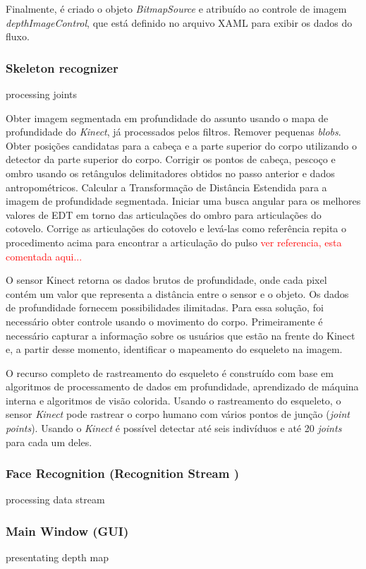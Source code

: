 Finalmente, é criado o objeto \textit{BitmapSource} e atribuído ao controle de imagem \textit{depthImageControl}, que está definido no arquivo XAML para exibir os dados do fluxo.


\subsubsection{Skeleton recognizer }\label{sec:skeleton}
processing joints

Obter imagem segmentada em profundidade do assunto usando o mapa de profundidade do \textit{Kinect}, já processados pelos filtros. Remover pequenas \textit{blobs}. Obter posições candidatas para a cabeça e a parte superior do corpo utilizando o detector da parte superior do corpo. Corrigir os pontos de cabeça, pescoço e ombro usando os retângulos delimitadores obtidos no passo anterior e dados antropométricos. Calcular a Transformação de Distância Estendida para a imagem de profundidade segmentada. Iniciar uma busca angular para os melhores valores de EDT em torno das articulações do ombro para articulações do cotovelo. Corrige as articulações do cotovelo e levá-las como referência repita o procedimento acima para encontrar a articulação do pulso \textcolor{red}{ver referencia, esta comentada aqui... %
}


O sensor Kinect retorna os dados brutos de profundidade, onde cada pixel contém um valor que representa a distância entre o sensor e o objeto. Os dados de profundidade fornecem possibilidades ilimitadas. Para essa solução, foi necessário obter controle usando o movimento do corpo. Primeiramente é necessário capturar a informação sobre os usuários que estão na frente do Kinect e, a partir desse momento, identificar o mapeamento do esqueleto na imagem.

O recurso completo de rastreamento do esqueleto é construído com base em algoritmos de processamento de dados em profundidade, aprendizado de máquina interna e algoritmos de visão colorida. Usando o rastreamento do esqueleto, o sensor \textit{Kinect} pode rastrear o corpo humano com vários pontos de junção (\textit{joint points}). Usando o \textit{Kinect} é possível detectar até seis indivíduos e até 20 \textit{joints} para cada um deles.



\subsubsection{Face Recognition (Recognition Stream )}\label{sec:depthDataRecognition}
processing data stream


\subsubsection{Main Window (GUI)}\label{sec:mainWindow}
presentating depth map